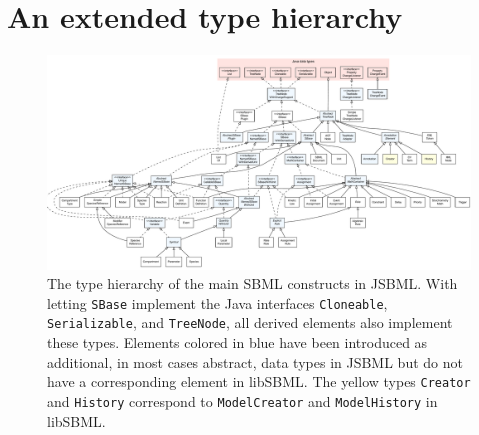 \section{An extended type hierarchy}

\begin{figure}
\centering
\includegraphics[width=\textwidth]{img/FullTypeHierarchy.pdf}
\caption[The type hierarchy of the main SBML constructs in JSBML]{The type
hierarchy of the main SBML constructs in JSBML.
With letting \texttt{SBase} implement the Java interfaces
\texttt{Cloneable}, \texttt{Serializable}, and \texttt{TreeNode}, all derived
elements also implement these types. Elements colored in blue have been
introduced as additional, in most cases abstract, data types in JSBML but do not
have a corresponding element in libSBML. The yellow types \texttt{Creator} and
\texttt{History} correspond to \texttt{ModelCreator} and \texttt{ModelHistory}
in libSBML.}
\label{fig:TypeHierarchy}
\end{figure}
